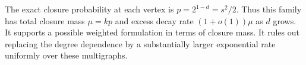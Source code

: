 The exact closure probability at each vertex is $p=2^{1-d}=s^2/2$.
Thus this family has total closure mass $\mu=kp$ and excess decay rate $(1+o(1))\mu$ as $d$ grows.
It supports a possible weighted formulation in terms of closure mass.
It rules out replacing the degree dependence by a substantially larger exponential rate uniformly over these multigraphs.
